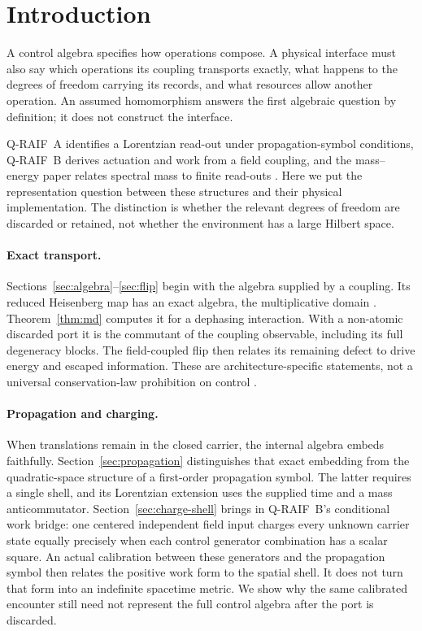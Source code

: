 \section{Introduction}
\label{sec:intro}

A control algebra specifies how operations compose. A physical interface must
also say which operations its coupling transports exactly, what happens to the
degrees of freedom carrying its records, and what resources allow another
operation. An assumed homomorphism answers the first algebraic question by
definition; it does not construct the interface.

Q-RAIF~A identifies a Lorentzian read-out under propagation-symbol conditions,
Q-RAIF~B derives actuation and work from a field coupling, and the mass--energy
paper relates spectral mass to finite read-outs
\cite{Liu2026QRAIF_A,Liu2026QRAIF_B,Liu2026QRAIF_ME}.
Here we put the representation question between these structures and their
physical implementation. The distinction is whether the relevant degrees of
freedom are discarded or retained, not whether the environment has a large
Hilbert space.

\paragraph{Exact transport.}
Sections~\ref{sec:algebra}--\ref{sec:flip} begin with the algebra supplied by a
coupling. Its reduced Heisenberg map has an exact algebra, the multiplicative
domain \cite{Stinespring1955,Choi1974,Paulsen2002}.
Theorem~\ref{thm:md} computes it for a dephasing interaction.
With a non-atomic discarded port it is the commutant of the coupling
observable, including its full degeneracy blocks. The field-coupled flip then
relates its remaining defect to drive energy and escaped information.
These are architecture-specific statements, not a universal
conservation-law prohibition on control
\cite{Wigner1952,ArakiYanase1960,Ozawa2002}.

\paragraph{Propagation and charging.}
When translations remain in the closed carrier, the internal algebra embeds
faithfully. Section~\ref{sec:propagation} distinguishes that exact embedding
from the quadratic-space structure of a first-order propagation symbol.
The latter requires a single shell, and its Lorentzian extension uses the
supplied time and a mass anticommutator.
Section~\ref{sec:charge-shell} brings in Q-RAIF~B's conditional work bridge:
one centered independent field input charges every unknown carrier state
equally precisely when each control generator combination has a scalar square.
An actual calibration between these generators and the propagation symbol
then relates the positive work form to the spatial shell. It does not turn
that form into an indefinite spacetime metric. We show why the same
calibrated encounter still need not represent the full control algebra after
the port is discarded.

